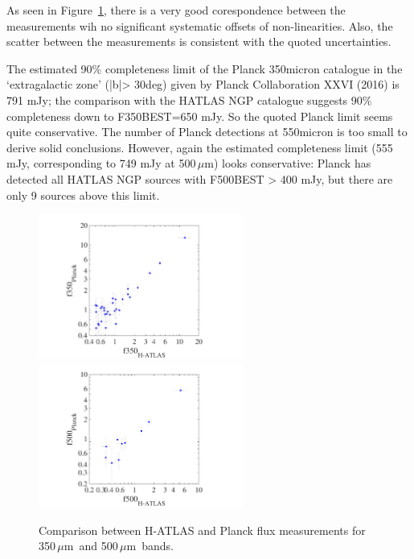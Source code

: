 \documentclass[a4paper,fleqn,usenatbib, twocolumn]{aastex61}
\def\mic{\,$\mu $m}
\begin{document}
As seen in Figure~\ref{fig:planck}, there is a very good
corespondence between the measurements wih no significant systematic
offsets of non-linearities. Also, the scatter between the measurements
is consistent with the quoted uncertainties.

The estimated 90\% completeness limit of the Planck 350micron
catalogue in the `extragalactic zone' (|b|> 30deg) given by Planck
Collaboration XXVI (2016) is 791 mJy; the comparison with the HATLAS
NGP catalogue suggests 90\% completeness down to F350BEST=650 mJy. So
the quoted Planck limit seems quite conservative. The number of Planck
detections at 550micron is too small to derive solid
conclusions. However, again the estimated completeness limit (555 mJy,
corresponding to 749 mJy at 500\mic) looks conservative: Planck has
detected all HATLAS NGP sources with F500BEST > 400 mJy, but there are
only 9 sources above this limit.



\begin{figure}
  \includegraphics[width=0.6\textwidth, trim=40mm .0mm 0.0mm .0mm, clip=True]{planck_comp350}
  \includegraphics[width=0.6\textwidth, trim=40mm .0mm 0.0mm .0mm, clip=True]{planck_comp500}
  \caption{Comparison between H-ATLAS and Planck flux measurements for
    350\mic\ and 500\mic\ bands.}\label{fig:planck}
\end{figure}
\end{document}
